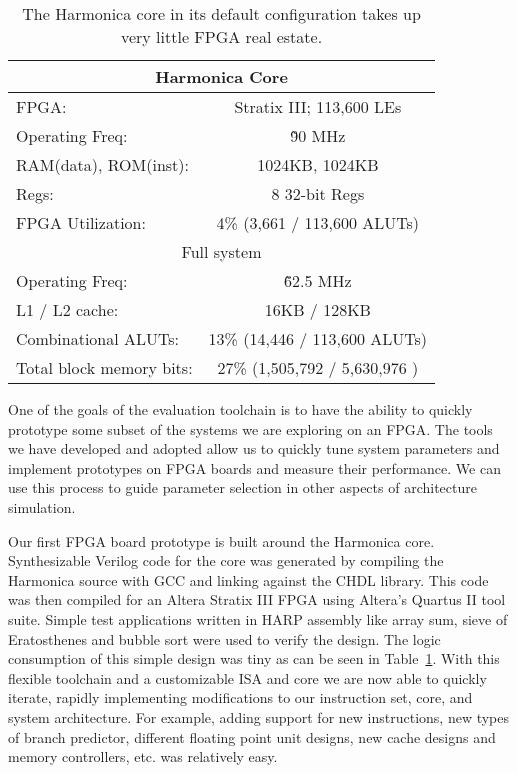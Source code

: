 \begin{table}
  \centering
  \begin{tabular}{|l|c|}
    \hline
    \multicolumn{2}{|c|}{Harmonica Core} \\
    \hline
    FPGA:&Stratix III; 113,600 LEs\\
    Operating Freq:&\~90 MHz\\
    RAM(data), ROM(inst):& 1024KB, 1024KB\\
    Regs:& 8 32-bit Regs\\
    FPGA Utilization:&4\%  (3,661 / 113,600 ALUTs)\\ \hline \hline
    \multicolumn{2}{|c|}{Full system} \\
    \hline
Operating Freq:&\~62.5 MHz\\
L1 / L2 cache:& 16KB / 128KB\\
Combinational ALUTs:&13\%	(14,446 / 113,600 ALUTs)\\
Total block memory bits:&27\%	(1,505,792 / 5,630,976 )\\
    \hline
  \end{tabular}
  \caption{The Harmonica core in its default configuration takes up very little FPGA real estate.}
  \label{table:fpga}
\end{table}

One of the goals of the evaluation toolchain is to have the ability to quickly prototype some subset of the systems we are exploring on an FPGA.
The tools we have developed and adopted allow us to quickly tune system parameters and implement prototypes on FPGA boards and measure their performance.
We can use this process to guide parameter selection in other aspects of architecture simulation.

Our first FPGA board prototype is built around the Harmonica core.
Synthesizable Verilog code for the core was generated by compiling the Harmonica source with GCC and linking against the CHDL library.
This code was then compiled for an Altera Stratix III FPGA using Altera's Quartus II tool suite.
Simple test applications written in HARP assembly like array sum, sieve of Eratosthenes and bubble sort were used to verify the design.
The logic consumption of this simple design was tiny as can be seen in Table~\ref{table:fpga}.
With this flexible toolchain and a customizable ISA and core we are now able to quickly iterate, rapidly implementing modifications to our instruction set, core, and system architecture.
For example, adding support for new instructions, new types of branch predictor, different floating point unit designs, new cache designs and memory controllers, etc. was relatively easy.

